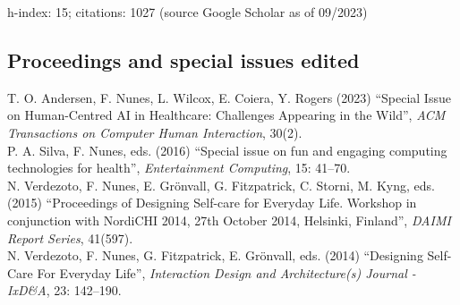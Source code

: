\documentclass[11pt, a4paper]{article} %
\newcommand{\years}[1]{\marginnote{\scriptsize #1}} %
\begin{document}
h-index: 15; citations: 1027 (source Google Scholar as of 09/2023)

\subsection*{Proceedings and special issues edited}

\years{2023}T. O. Andersen, F. Nunes, L. Wilcox, E. Coiera, Y. Rogers (2023) ``Special Issue on Human-Centred AI in Healthcare: Challenges Appearing in the Wild'', \emph{ACM Transactions on Computer Human Interaction}, 30(2).\\
\years{2016}P. A. Silva, F. Nunes, eds. (2016) ``Special issue on fun and engaging computing technologies for health'', \emph{Entertainment Computing}, 15: 41--70.\\
\years{2015}N. Verdezoto, F. Nunes, E. Grönvall, G. Fitzpatrick, C. Storni, M. Kyng, eds. (2015) ``Proceedings of Designing Self-care for Everyday Life. Workshop in conjunction with NordiCHI 2014, 27th October 2014, Helsinki, Finland'', \emph{DAIMI Report Series}, 41(597).\\
\years{2014}N. Verdezoto, F. Nunes, G. Fitzpatrick, E. Grönvall, eds. (2014) ``Designing Self-Care For Everyday Life'', \emph{Interaction Design and Architecture(s) Journal - IxD\&A}, 23: 142--190.
\end{document}
